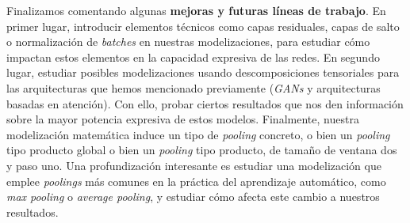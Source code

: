 Finalizamos comentando algunas \textbf{mejoras y futuras líneas de trabajo}. En primer lugar, introducir elementos técnicos como capas residuales, capas de salto o normalización de \textit{batches} en nuestras modelizaciones, para estudiar cómo impactan estos elementos en la capacidad expresiva de las redes. En segundo lugar, estudiar posibles modelizaciones usando descomposiciones tensoriales para las arquitecturas que hemos mencionado previamente (\textit{GANs} y arquitecturas basadas en atención). Con ello, probar ciertos resultados que nos den información sobre la mayor potencia expresiva de estos modelos. Finalmente, nuestra modelización matemática induce un tipo de \textit{pooling} concreto, o bien un \textit{pooling} tipo producto global o bien un \textit{pooling} tipo producto, de tamaño de ventana dos y paso uno. Una profundización interesante es estudiar una modelización que emplee \textit{poolings} más comunes en la práctica del aprendizaje automático, como \textit{max pooling} o \textit{average pooling}, y estudiar cómo afecta este cambio a nuestros resultados.
